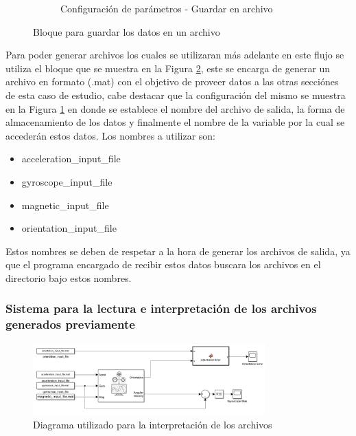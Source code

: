 \begin{figure}[htbp]
\begin{subfigure}[b]{0.45\textwidth}
        \caption{Configuración de parámetros - Guardar en archivo}
        \label{fig:config_to_file_IMU}
    \end{subfigure}
    \caption{Bloque para guardar los datos en un archivo}
    \label{fig:to_file_IMU}
\end{figure}

Para poder generar archivos los cuales se utilizaran más adelante en este flujo se utiliza el bloque que se muestra en la Figura \ref{fig:to_file_IMU}, este se encarga de generar un archivo en formato (.mat) con el objetivo de proveer datos a las otras secciónes de esta caso de estudio, cabe destacar que la configuración del mismo se muestra en la Figura \ref{fig:config_to_file_IMU} en donde se establece el nombre del archivo de salida, la forma de almacenamiento de los datos y finalmente el nombre de la variable por la cual se accederán estos datos. Los nombres a utilizar son:

\begin{itemize}
    \item acceleration\_input\_file
    \item gyroscope\_input\_file
    \item magnetic\_input\_file
    \item orientation\_input\_file
\end{itemize}

Estos nombres se deben de respetar a la hora de generar los archivos de salida, ya que el programa encargado de recibir estos datos buscara los archivos en el directorio bajo estos nombres.

\subsubsection{Sistema para la lectura e interpretación de los archivos generados previamente}

\begin{figure}[h!]
    \centering
    \includegraphics[width=0.8\textwidth]{fig/Capitulo5/Caso_de_estudio_IMU/Generador_de_salidas/flujo_lector_de_archivos.png}
    \caption{Diagrama utilizado para la interpretación de los archivos \cite{mathworks2024imu}}
    \label{fig:caso_de_estudio_2_IMU_interpretacion_de_archivos}
\end{figure}



